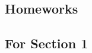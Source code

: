 \newpage
\begin{appendices}






\section{Homeworks}
\subsection{For Section 1}



\end{appendices}